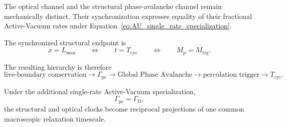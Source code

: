 The optical channel and the structural phase-avalanche channel remain
mechanically distinct. Their synchronization expresses equality of their
fractional Active-Vacuum rates under
Equation~\eqref{eq:AU_single_rate_specialization}.

The synchronized structural endpoint is
\begin{equation}
    x
    =
    L_{\mathrm{max}}
    \qquad\Longleftrightarrow\qquad
    t
    =
    T_{\mathrm{cyc}}
    \qquad\Longleftrightarrow\qquad
    M_{\mathrm p}
    =
    M_{\mathrm{trg}}.
\end{equation}

The resulting hierarchy is therefore
\begin{equation}
    \boxed{
    \text{live-boundary conservation}
    \rightarrow
    \Gamma_{\mathrm{pc}}
    \rightarrow
    \text{Global Phase Avalanche}
    \rightarrow
    \text{percolation trigger}
    \rightarrow
    T_{\mathrm{cyc}}.
    }
\end{equation}

Under the additional single-rate Active-Vacuum specialization,
\begin{equation}
    \Gamma_{\mathrm{pc}}
    =
    \Gamma_{\mathrm D},
\end{equation}
the structural and optical clocks become reciprocal projections of one common
macroscopic relaxation timescale.